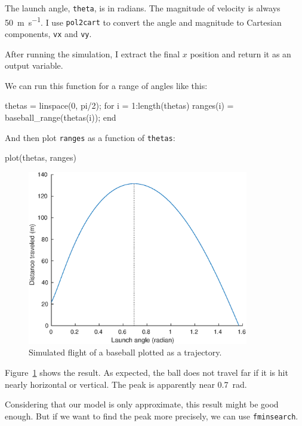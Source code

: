 \documentclass[
]{book}
\numberwithin{Answer}{chapter}
\numberwithin{Exercise}{chapter}
\begin{document}
The launch angle, {\tt theta}, is in radians.  The magnitude of velocity is always \SI{50}{\meter\per\second}.  I use {\tt pol2cart} to convert the angle and magnitude to Cartesian components, {\tt vx} and {\tt vy}.


After running the simulation, I extract the final $x$ position and return it as an output variable.  

We can run this function for a range of angles like this:

\begin{code}
    thetas = linspace(0, pi/2);
    for i = 1:length(thetas)
        ranges(i) = baseball_range(thetas(i));
    end
\end{code}

And then plot {\tt ranges} as a function of {\tt thetas}:

\begin{code}
    plot(thetas, ranges)
\end{code}

\begin{figure}
\centerline{\includegraphics[height=3in]{book/figs/baseball4.eps}}
\caption{Simulated flight of a baseball plotted as a trajectory.}
\label{fig:baseball4}
\end{figure}

Figure~\ref{fig:baseball4} shows the result.  As expected, the ball does not travel far if it is hit nearly horizontal or vertical. 
The peak is apparently near \SI{0.7}{\radian}.

Considering that our model is only approximate, this result might be good enough.  But if we want to find the peak more precisely, we can use {\tt fminsearch}.
\end{document}
